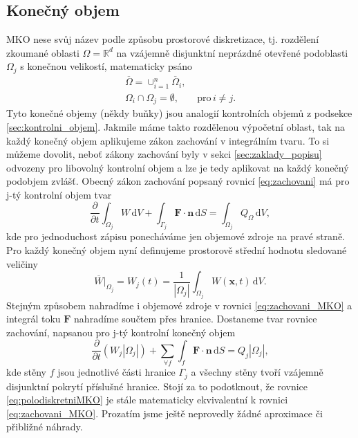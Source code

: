 \subsection{Konečný objem}
MKO nese svůj název podle způsobu prostorové diskretizace, tj. rozdělení zkoumané oblasti $\Omega=\mathbb{R}^d$ na vzájemně disjunktní neprázdné otevřené podoblasti $\Omega_j$ s konečnou velikostí, matematicky psáno
\begin{align*}
\overline{\Omega} = \cup^n_{i=1}\overline{\Omega}_i,&\\
\Omega_i \cap \Omega_j = \emptyset,& \,\,\mathrm{pro} \, i \neq j.
\end{align*}
Tyto konečné objemy (někdy buňky) jsou analogií kontrolních objemů z podsekce \ref{sec:kontrolni_objem}. Jakmile máme takto rozdělenou výpočetní oblast, tak na každý konečný objem aplikujeme zákon zachování v integrálním tvaru. To si můžeme dovolit, neboť zákony zachování byly v sekci \ref{sec:zaklady_popisu} odvozeny pro libovolný kontrolní objem a lze je tedy aplikovat na každý konečný podobjem zvlášť. Obecný zákon zachování popsaný rovnicí \ref{eq:zachovani} má pro j-tý kontrolní objem tvar
\begin{equation}\label{eq:zachovani_MKO}
\frac{\partial}{\partial t} \int_{\Omega_j}W\,\mathrm{d}V + \int_{\Gamma_j} \mathbf{F} \cdot \mathbf{n} \,\mathrm{d}S = \int_{\Omega_j}Q_\Omega \,\mathrm{d}V,
\end{equation}
kde pro jednoduchost zápisu ponecháváme jen objemové zdroje na pravé straně.
Pro každý konečný objem nyní definujeme prostorově střední hodnotu sledované veličiny 
\begin{equation}
\overline{W}|_{\Omega_j}= W_j(t) = \frac{1}{|\Omega_j|}\int_{\Omega_j}W(\mathbf{x},t) \,\mathrm{d} V.
\end{equation}
Stejným způsobem nahradíme i objemové zdroje v rovnici \ref{eq:zachovani_MKO} a integrál toku $\mathbf{F}$ nahradíme součtem přes hranice. Dostaneme tvar rovnice zachování, napsanou pro j-tý kontrolní konečný objem
\begin{equation}\label{eq:polodiskretniMKO}
\frac{\partial}{\partial t} (W_j|\Omega_j|) + \sum_{\forall f} \int_{f}\mathbf{F}\cdot \mathbf{n} \,\mathrm{d}S = Q_j|\Omega_j|,
\end{equation} 
kde stěny $f$ jsou jednotlivé části hranice $\Gamma_j$ a všechny stěny tvoří vzájemně disjunktní pokrytí příslušné hranice.
Stojí za to podotknout, že rovnice \ref{eq:polodiskretniMKO} je stále matematicky ekvivalentní k rovnici \ref{eq:zachovani_MKO}.
Prozatím jsme ještě neprovedly žádné aproximace či přibližné náhrady.

